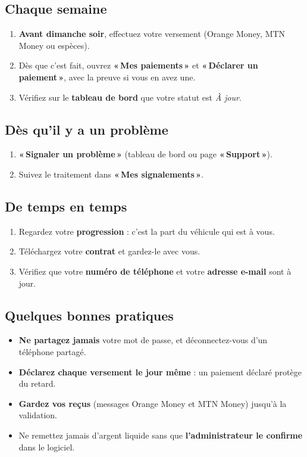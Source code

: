 \documentclass[11pt,a4paper]{article}
\newcommand{\Needspace}[1]{\par\ifdim\pagegoal<\maxdimen\ifdim\dimexpr\pagegoal-\pagetotal\relax<#1\relax\newpage\fi\fi}
\newcommand{\bouton}[1]{\textbf{«\,#1\,»}}
\let\oldsubsection\subsection
\renewcommand{\subsection}{\Needspace{5.5cm}\oldsubsection}
\begin{document}
\subsection{Chaque semaine}
\begin{enumerate}
  \item \textbf{Avant dimanche soir}, effectuez votre versement (Orange Money, MTN Money ou espèces).
  \item Dès que c'est fait, ouvrez \bouton{Mes paiements} et \bouton{Déclarer un paiement}, avec la preuve si vous en avez une.
  \item Vérifiez sur le \textbf{tableau de bord} que votre statut est \textit{À jour}.
\end{enumerate}

\subsection{Dès qu'il y a un problème}
\begin{enumerate}
  \item \bouton{Signaler un problème} (tableau de bord ou page \bouton{Support}).
  \item Suivez le traitement dans \bouton{Mes signalements}.
\end{enumerate}

\subsection{De temps en temps}
\begin{enumerate}
  \item Regardez votre \textbf{progression} : c'est la part du véhicule qui est à vous.
  \item Téléchargez votre \textbf{contrat} et gardez-le avec vous.
  \item Vérifiez que votre \textbf{numéro de téléphone} et votre \textbf{adresse e-mail} sont à jour.
\end{enumerate}

\subsection{Quelques bonnes pratiques}
\begin{itemize}
  \item \textbf{Ne partagez jamais} votre mot de passe, et déconnectez-vous d'un téléphone partagé.
  \item \textbf{Déclarez chaque versement le jour même} : un paiement déclaré protège du retard.
  \item \textbf{Gardez vos reçus} (messages Orange Money et MTN Money) jusqu'à la validation.
  \item Ne remettez jamais d'argent liquide sans que \textbf{l'administrateur le confirme} dans le logiciel.
\end{itemize}
\end{document}

